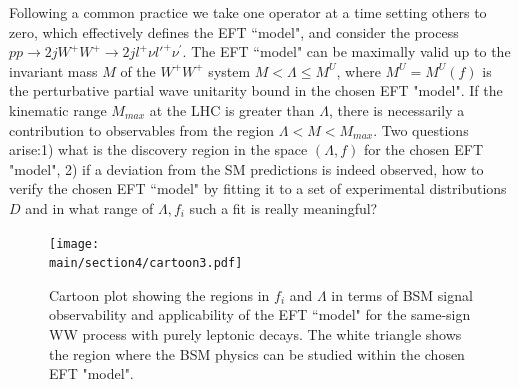 \documentclass[../report.tex]{subfiles}
\providecommand{\main}{..}
\begin{document}
Following a common practice we take one operator at a time setting others to 
zero,  which effectively defines the EFT ``model", 
and consider   the process 
$pp\rightarrow 2jW^+ W^+ \rightarrow 2j l^+\nu l'^+\nu^\prime$. 
The EFT ``model" can be maximally valid up to the invariant mass $M$ of the 
$W^+W^+$ system 
$M<\Lambda\leq M^U$, where $M^U=M^U(f)$ is the perturbative partial wave unitarity bound  in the chosen EFT "model".  
If  the kinematic range $M_{max}$  at the LHC is greater than $\Lambda$, there is necessarily a 
contribution to observables from the region $\Lambda < M < M_{max}$.  
Two questions arise:1) what is the discovery region in the space $(\Lambda, f)$ for the chosen EFT "model", 2) if a deviation from  the SM predictions is indeed observed,
how to verify the chosen EFT  ``model"  by fitting it to a set of experimental distributions $D$ 
and in what range of $\Lambda, f_i$ such a fit is really meaningful?
%
%
\begin{figure}
\texttt{[image: \\main/section4/cartoon3.pdf]}
\caption{
Cartoon plot showing the regions in $f_i$ and $\Lambda$ in terms of BSM signal observability
and applicability of the EFT ``model"  for  the same-sign WW process with purely 
leptonic decays.  The white triangle shows the region
where the BSM physics can be studied within the chosen EFT "model".}
\label{fig:cartoonplot}
\end{figure}
%
\end{document}
